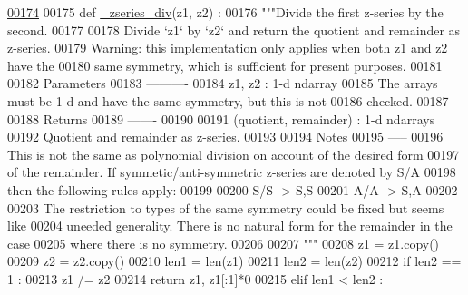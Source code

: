 \begin{DoxyCode}
\hypertarget{namespacepyneb_1_1utils_1_1chebyshev_l00174}{}\hyperlink{namespacepyneb_1_1utils_1_1chebyshev_a9ec3445ca77071adc655bacf9299c451}{00174} 
00175 \textcolor{keyword}{def }\hyperlink{namespacepyneb_1_1utils_1_1chebyshev_a9ec3445ca77071adc655bacf9299c451}{\_zseries\_div}(z1, z2) :
00176     \textcolor{stringliteral}{"""Divide the first z-series by the second.}
00177 \textcolor{stringliteral}{}
00178 \textcolor{stringliteral}{    Divide `z1` by `z2` and return the quotient and remainder as z-series.}
00179 \textcolor{stringliteral}{    Warning: this implementation only applies when both z1 and z2 have the}
00180 \textcolor{stringliteral}{    same symmetry, which is sufficient for present purposes.}
00181 \textcolor{stringliteral}{}
00182 \textcolor{stringliteral}{    Parameters}
00183 \textcolor{stringliteral}{    ----------}
00184 \textcolor{stringliteral}{    z1, z2 : 1-d ndarray}
00185 \textcolor{stringliteral}{        The arrays must be 1-d and have the same symmetry, but this is not}
00186 \textcolor{stringliteral}{        checked.}
00187 \textcolor{stringliteral}{}
00188 \textcolor{stringliteral}{    Returns}
00189 \textcolor{stringliteral}{    -------}
00190 \textcolor{stringliteral}{}
00191 \textcolor{stringliteral}{    (quotient, remainder) : 1-d ndarrays}
00192 \textcolor{stringliteral}{        Quotient and remainder as z-series.}
00193 \textcolor{stringliteral}{}
00194 \textcolor{stringliteral}{    Notes}
00195 \textcolor{stringliteral}{    -----}
00196 \textcolor{stringliteral}{    This is not the same as polynomial division on account of the desired form}
00197 \textcolor{stringliteral}{    of the remainder. If symmetic/anti-symmetric z-series are denoted by S/A}
00198 \textcolor{stringliteral}{    then the following rules apply:}
00199 \textcolor{stringliteral}{}
00200 \textcolor{stringliteral}{    S/S -> S,S}
00201 \textcolor{stringliteral}{    A/A -> S,A}
00202 \textcolor{stringliteral}{}
00203 \textcolor{stringliteral}{    The restriction to types of the same symmetry could be fixed but seems like}
00204 \textcolor{stringliteral}{    uneeded generality. There is no natural form for the remainder in the case}
00205 \textcolor{stringliteral}{    where there is no symmetry.}
00206 \textcolor{stringliteral}{}
00207 \textcolor{stringliteral}{    """}
00208     z1 = z1.copy()
00209     z2 = z2.copy()
00210     len1 = len(z1)
00211     len2 = len(z2)
00212     \textcolor{keywordflow}{if} len2 == 1 :
00213         z1 /= z2
00214         \textcolor{keywordflow}{return} z1, z1[:1]*0
00215     \textcolor{keywordflow}{elif} len1 < len2 :

\end{DoxyCode}

